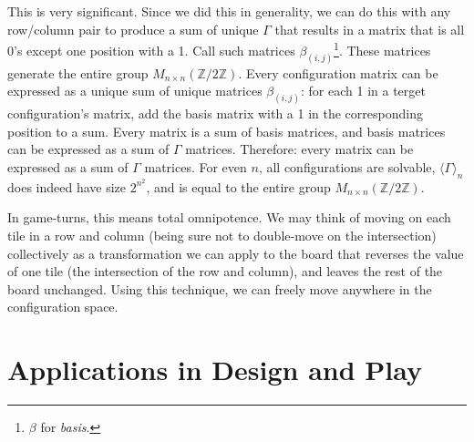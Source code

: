 \documentclass{article}[12pt]
\newcommand{\basis}[2]{\beta_{(#1,#2)}}
\newcommand{\group}[1]{M_{#1 \times #1}(\mathbb{Z}/2\mathbb{Z})}
\newcommand{\subgroup}[1]{\langle\Gamma\rangle_{#1}}
\begin{document}
This is very significant.  Since we did this in generality, we can do this with any row/column pair to produce a sum of unique $\Gamma$ that results in a matrix that is all 0's except one position with a 1.  Call such matrices $\basis{i}{j}$\footnote{$\beta$ for \emph{basis}.}.  These matrices generate the entire group $\group{n}$.  Every configuration matrix can be expressed as a unique sum of unique matrices $\basis{i}{j}$: for each 1 in a terget configuration's matrix, add the basis matrix with a 1 in the corresponding position to a sum.  Every matrix is a sum of basis matrices, and basis matrices can be expressed as a sum of $\Gamma$ matrices.  Therefore: every matrix can be expressed as a sum of $\Gamma$ matrices.  For even $n$, all configurations are solvable, $\subgroup{n}$ does indeed have size $2^{n^2}$, and is equal to the entire group $\group{n}$.

In game-turns, this means total omnipotence.  We may think of moving on each tile in a row and column (being sure not to double-move on the intersection) collectively as a transformation we can apply to the board that reverses the value of one tile (the intersection of the row and column), and leaves the rest of the board unchanged.  Using this technique, we can freely move anywhere in the configuration space.

\section{Applications in Design and Play}
\label{applications}
\end{document}
